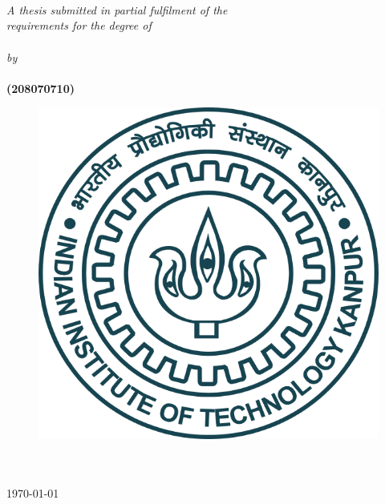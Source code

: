 \documentclass[11pt, a4paper, oneside]{Thesis} %
\begin{document}
\begin{titlepage}
\begin{center}

\HRule \\[0.4cm] %
{\huge \bfseries \ttitle}\\[0.4cm] %
\HRule \\[1.5cm] %
 
\large \textit{A thesis submitted in partial fulfilment of the \\requirements for the degree of}\\[0.3cm]
\textbf{\degreename}\\[0.3cm] %
\textit{by}\\[0.3cm]
\textbf{\authornames} \\[0.3cm]
\textbf{(208070710)}

\vfill
\graphicspath{ {./Figures/} }
\begin{figure}[hb]
  \centering
  \includegraphics[width=0.35\linewidth]{images/iitk_logo.png}
\end{figure}

\DEPTNAME\\ %
\textsc{ \UNIVNAME}\\[1.5cm] %
\large \today\\[2cm] %


\end{center}

\end{titlepage}


\setcounter{page}{2}
\end{document}
